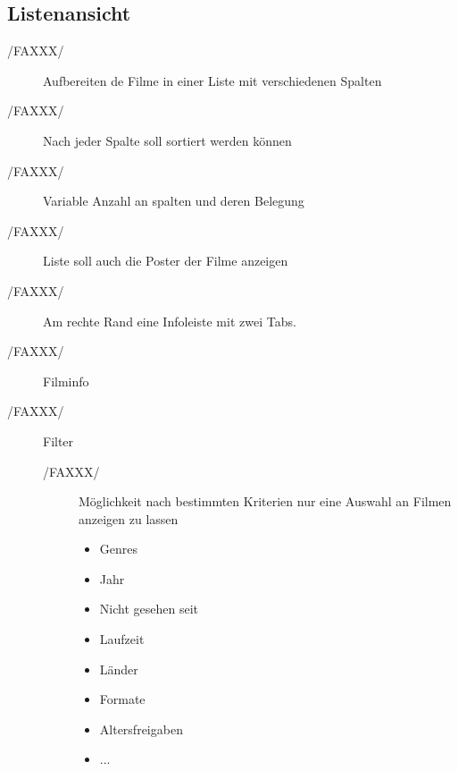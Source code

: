 \subsection{Listenansicht}
\begin{description}
	\item[/FAXXX/] Aufbereiten de Filme in einer Liste mit verschiedenen Spalten
	\item[/FAXXX/] Nach jeder Spalte soll sortiert werden können
	\item[/FAXXX/] Variable Anzahl an spalten und deren Belegung
	\item[/FAXXX/] Liste soll auch die Poster der Filme anzeigen
	\item[/FAXXX/] Am rechte Rand eine Infoleiste mit zwei Tabs.
	\item[/FAXXX/] Filminfo
	\item[/FAXXX/] Filter
	\begin{description}
		\item[/FAXXX/] Möglichkeit nach bestimmten Kriterien nur eine Auswahl an Filmen anzeigen zu lassen
		\begin{itemize}
			\item Genres
			\item Jahr
			\item Nicht gesehen seit
			\item Laufzeit
			\item Länder
			\item Formate
			\item Altersfreigaben
			\item ...
		\end{itemize}
	\end{description}
\end{description}


